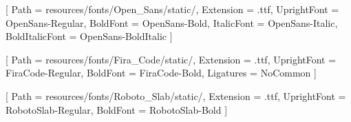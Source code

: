 \usepackage{fontspec}
\usepackage[russian]{babel}

\setmainfont{Open Sans}[
  Path = resources/fonts/Open_Sans/static/,
  Extension = .ttf,
  UprightFont = OpenSans-Regular,
  BoldFont = OpenSans-Bold,
  ItalicFont = OpenSans-Italic,
  BoldItalicFont = OpenSans-BoldItalic
]

\setmonofont{Fira Code}[
  Path = resources/fonts/Fira_Code/static/,
  Extension = .ttf,
  UprightFont = FiraCode-Regular,
  BoldFont = FiraCode-Bold,
  Ligatures = NoCommon
]

\newfontfamily{}[
  Path = resources/fonts/Roboto_Slab/static/,
  Extension = .ttf,
  UprightFont = RobotoSlab-Regular,
  BoldFont = RobotoSlab-Bold
]
